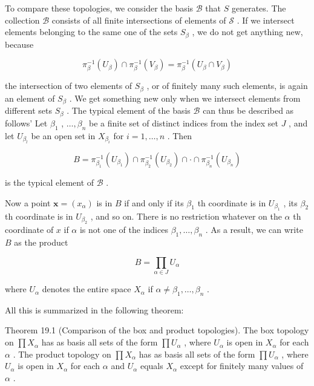 \documentclass[10pt]{article}
\begin{document}
To compare these topologies, we consider the basis \(\mathcal{B}\) that \(S\) generates. The collection \(\mathcal{B}\) consists of all finite intersections of elements of \(\mathcal{S}\) . If we intersect elements belonging to the same one of the sets \({S}_{\beta }\) , we do not get anything new, because

\[
{\pi }_{\beta }^{-1}\left( {U}_{\beta }\right)  \cap  {\pi }_{\beta }^{-1}\left( {V}_{\beta }\right)  = {\pi }_{\beta }^{-1}\left( {{U}_{\beta } \cap  {V}_{\beta }}\right)
\]

the intersection of two elements of \({S}_{\beta }\) , or of finitely many such elements, is again an element of \({S}_{\beta }\) . We get something new only when we intersect elements from different sets \({S}_{\beta }\) . The typical element of the basis \(\mathcal{B}\) can thus be described as follows’ Let \({\beta }_{1}\) , \(\ldots ,{\beta }_{n}\) be a finite set of distinct indices from the index set \(J\) , and let \({U}_{{\beta }_{l}}\) be an open set in \({X}_{{\beta }_{i}}\) for \(i = 1,\ldots ,n\) . Then

\[
B = {\pi }_{{\beta }_{1}}^{-1}\left( {U}_{{\beta }_{1}}\right)  \cap  {\pi }_{{\beta }_{2}}^{-1}\left( {U}_{{\beta }_{2}}\right)  \cap   \cdot   \cap  {\pi }_{{\beta }_{n}}^{-1}\left( {U}_{{\beta }_{n}}\right)
\]

is the typical element of \(\mathcal{B}\) .

Now a point \(\mathbf{x} = \left( {x}_{\alpha }\right)\) is in \(B\) if and only if its \({\beta }_{1}\) th coordinate is in \({U}_{{\beta }_{1}}\) , its \({\beta }_{2}\) th coordinate is in \({U}_{{\beta }_{2}}\) , and so on. There is no restriction whatever on the \(\alpha\) th coordinate of \(x\) if \(\alpha\) is not one of the indices \({\beta }_{1},\ldots ,{\beta }_{n}\) . As a result, we can write \(B\) as the product

\[
B = \mathop{\prod }\limits_{{\alpha  \in  J}}{U}_{\alpha }
\]

where \({U}_{\alpha }\) denotes the entire space \({X}_{\alpha }\) if \(\alpha  \neq  {\beta }_{1},\ldots ,{\beta }_{n}\) .

All this is summarized in the following theorem:

Theorem 19.1 (Comparison of the box and product topologies). The box topology on \(\prod {X}_{\alpha }\) has as basis all sets of the form \(\prod {U}_{\alpha }\) , where \({U}_{\alpha }\) is open in \({X}_{\alpha }\) for each \(\alpha\) . The product topology on \(\prod {X}_{\alpha }\) has as basis all sets of the form \(\prod {U}_{\alpha }\) , where \({U}_{\alpha }\) is open in \({X}_{\alpha }\) for each \(\alpha\) and \({U}_{\alpha }\) equals \({X}_{\alpha }\) except for finitely many values of \(\alpha\) .
\end{document}
